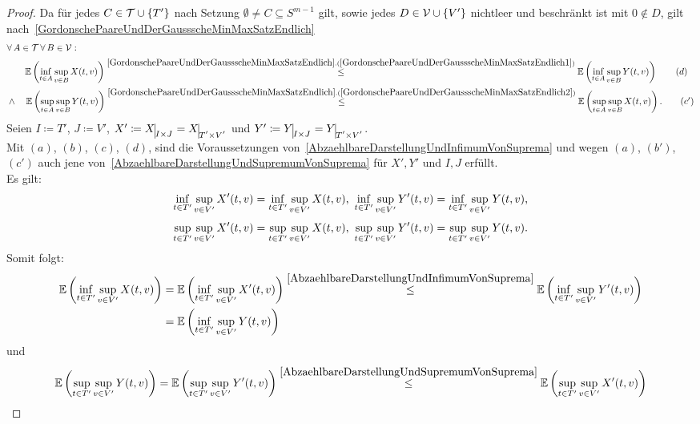 \begin{proof}
Da für jedes $C \in \mathcal{T} \cup \left\{T'\right\}$ nach Setzung 
$\emptyset \neq C \subseteq S^{m-1}$ gilt, sowie jedes 
$D \in \mathcal{V} \cup \left\{V'\right\}$
nichtleer und beschränkt ist mit $0 \notin D$, gilt nach~\ref{GordonschePaareUndDerGaussscheMinMaxSatzEndlich}
\begin{align*}
&\forall\, A \in \mct\, \forall\, B \in \mcv:\\
& \quad\quad\E\left(\inf_{t \in A}\sup_{v \in B}X(t, v) \right)
 \overset{\refclaim{GordonschePaareUndDerGaussscheMinMaxSatzEndlich}
{GordonschePaareUndDerGaussscheMinMaxSatzEndlich1}}\le
 \E\left(\inf_{t \in A}\sup_{v \in B}Y(t, v)\right) \tag {$d$}\\
& \wedge \quad
 \E\left(\sup_{t \in A}\sup_{v \in B}Y(t, v) \right)
 \overset{\refclaim{GordonschePaareUndDerGaussscheMinMaxSatzEndlich}
{GordonschePaareUndDerGaussscheMinMaxSatzEndlich2}}\le
 \E\left(\sup_{t \in A}\sup_{v \in B}X(t, v)\right) \text.\tag {$c'$}
\end{align*}
Seien $I\coloneqq T'$, $J\coloneqq V'$, $X'\coloneqq  \restrict{X}{I\times J} = \restrict{X}{T' \times V'}$ und
$Y'\coloneqq \restrict{Y}{I \times J}= \restrict{Y}{T' \times V'}$.\\
Mit $(a)$, $(b)$, $(c)$, $(d)$, sind die Voraussetzungen von~\ref{AbzaehlbareDarstellungUndInfimumVonSuprema} und
wegen $(a)$, $(b')$, $(c')$ auch jene von~\ref{AbzaehlbareDarstellungUndSupremumVonSuprema} für $X', Y'$
und $I, J$ erfüllt.\\
Es gilt:
\[\inf_{t \in T'}\sup_{v \in V'}X'(t,v) =
  \inf_{t \in T'}\sup_{v \in V'}X(t, v)\text, \ 
  \inf_{t \in T'}\sup_{v \in V'}Y'(t,v) =
  \inf_{t \in T'}\sup_{v \in V'}Y(t, v)\text,\]
\[\sup_{t \in T'}\sup_{v \in V'}X'(t,v) =
  \sup_{t \in T'}\sup_{v \in V'}X(t, v), \ 
  \sup_{t \in T'}\sup_{v \in V'}Y'(t,v) =
  \sup_{t \in T'}\sup_{v \in V'}Y(t, v)\text.\]
Somit folgt:
\begin{align}\mathbb{E}\left(\inf_{t \in T'}\sup_{v \in V'}X(t, v)\right) &=
\mathbb{E}\left(\inf_{t \in T'}\sup_{v \in V'}X'(t, v)\right) 
\overset{\ref{AbzaehlbareDarstellungUndInfimumVonSuprema}}\le
\mathbb{E}\left(\inf_{t \in T'}\sup_{v \in V'}Y'(t, v)\right)\notag\\
&= \mathbb{E}\left(\inf_{t \in T'}\sup_{v \in V'}Y(t, v)\right) \label{gpudgmmseq:1}
\end{align}
und
\begin{align}\E\left(\sup_{t \in T'}\sup_{v \in V'}Y(t, v)\right) &=
\E\left(\sup_{t \in T'}\sup_{v \in V'}Y'(t, v)\right) 
\overset{\ref{AbzaehlbareDarstellungUndSupremumVonSuprema}}\le
\E\left(\sup_{t \in T'}\sup_{v \in V'}X'(t, v)\right)\notag\\

\end{align}
\end{proof}
